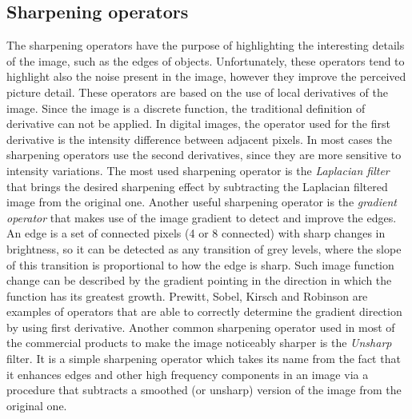 \documentclass[final,a4paper,12pt,english]{UnicaPhdThesis3}
\begin{document}
\subsection{Sharpening operators} %
The sharpening operators have the purpose of highlighting the interesting details of the image, such as the edges of objects. Unfortunately, these operators tend to highlight also the noise present in the image, however they improve the perceived picture detail. These operators are based on the use of local derivatives of the image. Since the image is a discrete function, the traditional definition of derivative can not be applied.
In digital images, the operator used for the first derivative is the intensity difference between adjacent pixels. In most cases the sharpening operators use the second derivatives, since they are more sensitive to intensity variations. The most used sharpening operator is the \textit{Laplacian filter} that brings the desired sharpening effect by subtracting the Laplacian filtered image from the original one. Another useful sharpening operator is the \textit{gradient operator} that makes use of the image gradient to detect and improve the edges. An edge is a set of connected pixels (4 or 8 connected) with sharp changes in brightness, so it can be detected as any transition of grey levels, where the slope of this transition is proportional to how the edge is sharp. Such image function change can be described by the gradient pointing in the direction in which the function has its greatest growth. Prewitt, Sobel, Kirsch and Robinson are examples of operators that are able to correctly determine the gradient direction by using first derivative. Another common sharpening operator used in most of the commercial products to make the image noticeably sharper is the \textit{Unsharp} filter. It is a simple sharpening operator which takes its name from the fact that it enhances edges and other high frequency components in an image via a procedure that subtracts a smoothed (or unsharp) version of the image from the original one. 
    
\end{document}
